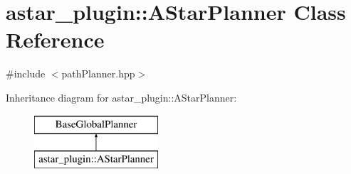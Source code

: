 \hypertarget{classastar__plugin_1_1_a_star_planner}{}\section{astar\+\_\+plugin\+:\+:A\+Star\+Planner Class Reference}
\label{classastar__plugin_1_1_a_star_planner}


{\ttfamily \#include $<$path\+Planner.\+hpp$>$}

Inheritance diagram for astar\+\_\+plugin\+:\+:A\+Star\+Planner\+:\begin{figure}[H]
\begin{center}
\leavevmode
\includegraphics[height=2.000000cm]{classastar__plugin_1_1_a_star_planner}
\end{center}
\end{figure}
